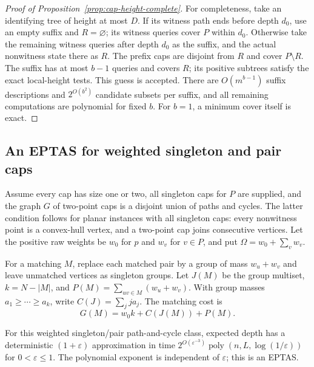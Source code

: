 \begin{proof}[Proof of Proposition~\ref{prop:cap-height-complete}]
For completeness, take an identifying tree of height at most $D$. If its witness
path ends before depth $d_0$, use an empty suffix and $R=\varnothing$;
its witness queries cover $P$ within $d_0$. Otherwise take the
remaining witness queries after depth $d_0$ as the suffix, and the
actual nonwitness state there as $R$. The prefix caps are disjoint
from $R$ and cover $P\setminus R$. The suffix has at most $b-1$
queries and covers $R$; its positive subtrees satisfy the exact
local-height tests. This guess is accepted. There are
$O(m^{b-1})$ suffix descriptions and $2^{O(b^2)}$ candidate subsets
per suffix, and all remaining computations are polynomial for
fixed $b$. For $b=1$, a minimum cover itself is exact.
\end{proof}

\subsection{An EPTAS for weighted singleton and pair caps}

Assume every cap has size one or two, all singleton caps for $P$
are supplied, and the graph $G$ of two-point caps is a disjoint
union of paths and cycles. The latter condition follows for planar
instances with all singleton caps: every nonwitness point is a
convex-hull vertex, and a two-point cap joins consecutive vertices.
Let the positive raw weights be $w_0$ for $p$ and $w_v$ for $v\in P$,
and put $\Omega=w_0+\sum_v w_v$.

For a matching $M$, replace each matched pair by a group of mass
$w_u+w_v$ and leave unmatched vertices as singleton groups. Let
$J(M)$ be the group multiset, $k=N-|M|$, and
$P(M)=\sum_{uv\in M}(w_u+w_v)$. With group masses
$a_1\ge\cdots\ge a_k$, write $C(J)=\sum_j j a_j$. The matching
cost is
\begin{equation}\label{eq:eptas-matching-invoice}
 G(M)=w_0k+C(J(M))+P(M).
\end{equation}

\begin{theorem}\label{thm:pair-eptas}
For this weighted singleton/pair path-and-cycle class, expected
depth has a deterministic $(1+\varepsilon)$ approximation in time
$2^{O(\varepsilon^{-3})}\operatorname{poly}(n,L,\log(1/\varepsilon))$
for $0<\varepsilon\le1$. The polynomial exponent is independent
of $\varepsilon$; this is an EPTAS.
\end{theorem}


